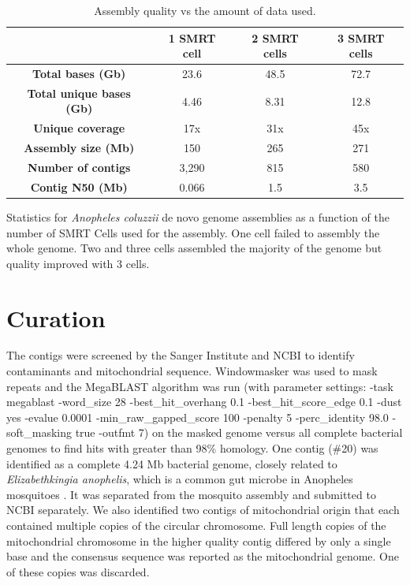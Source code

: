 \begin{table}[htbp!]
\caption{Assembly quality vs the amount of data used.}\label{table:smrtcells}
\begin{tabular}{| c | c | c | c |}
\hline
 & \textbf{1 SMRT cell} & \textbf{2 SMRT cells} & \textbf{3 SMRT cells} \\\hline
 \textbf{Total bases (Gb)} & 23.6 & 48.5 & 72.7 \\\hline
  \textbf{Total unique bases (Gb)} & 4.46 & 8.31 & 12.8 \\\hline 
  \textbf{Unique coverage} & 17x & 31x & 45x \\\hline 
  \textbf{Assembly size (Mb)} & 150 & 265 & 271 \\\hline 
  \textbf{Number of contigs} & 3,290 & 815 & 580 \\\hline 
  \textbf{Contig N50 (Mb)} & 0.066 & 1.5 & 3.5 \\\hline
\end{tabular}
\par{Statistics for \textit{Anopheles coluzzii} de novo genome assemblies as a function of the number of
SMRT Cells used for the assembly. One cell failed to assembly the whole genome. Two and three cells assembled the majority of the genome but quality improved with 3 cells.}
\end{table}




\section{Curation}

\par{
The contigs were screened by the Sanger Institute and NCBI to identify contaminants and mitochondrial sequence. Windowmasker was used to mask repeats and the MegaBLAST algorithm was run (with parameter settings: -task megablast -word\_size 28 -best\_hit\_overhang 0.1 -best\_hit\_score\_edge 0.1 -dust yes -evalue 0.0001 -min\_raw\_gapped\_score 100 -penalty 5 -perc\_identity 98.0 -soft\_masking true -outfmt 7) on the masked genome versus all complete bacterial genomes to find hits with  greater than 98\% homology\cite{windowmasker}\cite{megablast}. One contig (\#20) was identified as a complete 4.24 Mb bacterial genome, closely related to \textit{Elizabethkingia anophelis}, which is a common gut microbe in Anopheles mosquitoes \cite{kingia}. It was separated from the mosquito assembly and submitted to NCBI separately. We also identified two contigs of mitochondrial origin that each contained multiple copies of the circular chromosome. Full length copies of the mitochondrial chromosome in the higher quality contig differed by only a single base and the consensus sequence was reported as the mitochondrial genome. One of these copies was discarded.
}

